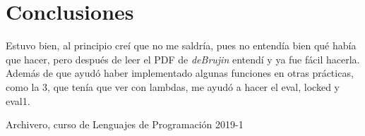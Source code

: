 \documentclass[spanish,12pt,letterpaper]{article}
\begin{document}
\section{Conclusiones}
Estuvo bien, al principio creí que no me saldría, pues no entendía bien qué
había que hacer, pero después de leer el PDF de \textit{deBrujin} entendí y ya
fue fácil hacerla. Además de que ayudó haber implementado algunas funciones en
otras prácticas, como la 3, que tenía que ver con lambdas, me ayudó a hacer el
eval, locked y eval1.


\begin{thebibliography}{9}

  Archivero, curso de Lenguajes de Programación 2019-1
\end{thebibliography}
\end{document}
